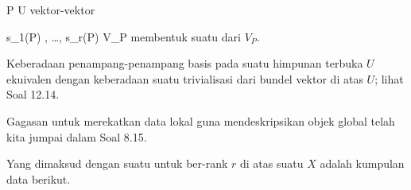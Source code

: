 \mavergleichskette
{\vergleichskette
{ P
}
{ \in }{ U
}
{  }{
}
{    }{
}
{   }{
}
}
{}{}{}
vektor-vektor

\mavergleichskette
{\vergleichskette
{ s_1(P)  , \ldots , s_r(P)
}
{ \in }{ V_P
}
{  }{
}
{    }{
}
{   }{
}
}
{}{}{}
membentuk suatu
dari $V_P$.

Keberadaan penampang-penampang basis
 {} {}
pada suatu himpunan terbuka $U$ ekuivalen dengan keberadaan suatu trivialisasi
 {} {}
dari bundel vektor di atas $U$; lihat
Soal 12.14.


Gagasan untuk merekatkan data lokal guna mendeskripsikan objek global telah kita jumpai dalam
Soal 8.15.

{}
{

Yang dimaksud dengan suatu
untuk
ber-rank $r$ di atas suatu
$X$ adalah kumpulan data berikut.

}


